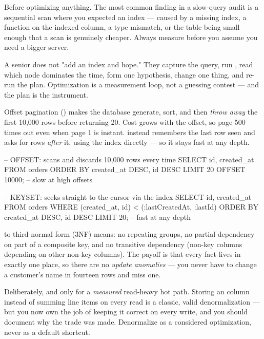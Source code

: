  Before optimizing anything. The most common finding in a slow-query audit is a sequential scan where you expected an index --- caused by a missing index, a function on the indexed column, a type mismatch, or the table being small enough that a scan is genuinely cheaper. Always measure before you assume you need a bigger server.

\begin{seniornote}
A senior does not "add an index and hope." They capture the query, run , read which node dominates the time, form one hypothesis, change one thing, and re-run the plan. Optimization is a measurement loop, not a guessing contest --- and the plan is the instrument.
\end{seniornote}


 Offset pagination () makes the database generate, sort, and then \emph{throw away} the first 10{,}000 rows before returning 20. Cost grows with the offset, so page 500 times out even when page 1 is instant.  instead remembers the last row seen and asks for rows \emph{after} it, using the index directly --- so it stays fast at any depth.

\begin{sqlbox}
-- OFFSET: scans and discards 10,000 rows every time
SELECT id, created_at FROM orders
ORDER BY created_at DESC, id DESC
LIMIT 20 OFFSET 10000;              -- slow at high offsets

-- KEYSET: seeks straight to the cursor via the index
SELECT id, created_at FROM orders
WHERE (created_at, id) < (:lastCreatedAt, :lastId)
ORDER BY created_at DESC, id DESC
LIMIT 20;                           -- fast at any depth
\end{sqlbox}

  to third normal form (3NF) means: no repeating groups, no partial dependency on part of a composite key, and no transitive dependency (non-key columns depending on other non-key columns). The payoff is that every fact lives in exactly one place, so there are no \emph{update anomalies} --- you never have to change a customer's name in fourteen rows and miss one.

 Deliberately, and only for a \emph{measured} read-heavy hot path. Storing an  column instead of summing line items on every read is a classic, valid denormalization --- but you now own the job of keeping it correct on every write, and you should document why the trade was made. Denormalize as a considered optimization, never as a default shortcut.

